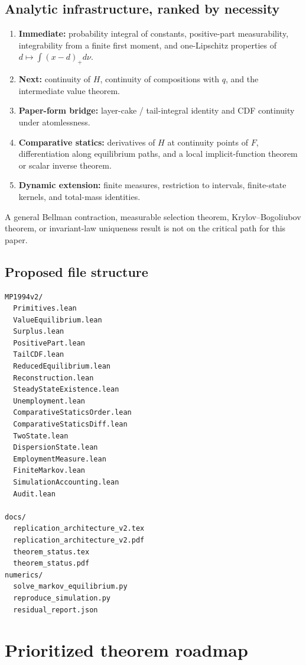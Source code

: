 \documentclass[11pt]{article}
\begin{document}
\subsection{Analytic infrastructure, ranked by necessity}

\begin{enumerate}
\item \textbf{Immediate:} probability integral of constants, positive-part measurability, integrability from a finite first moment, and one-Lipschitz properties of $d\mapsto\int(x-d)_+d\nu$.
\item \textbf{Next:} continuity of $H$, continuity of compositions with $q$, and the intermediate value theorem.
\item \textbf{Paper-form bridge:} layer-cake / tail-integral identity and CDF continuity under atomlessness.
\item \textbf{Comparative statics:} derivatives of $H$ at continuity points of $F$, differentiation along equilibrium paths, and a local implicit-function theorem or scalar inverse theorem.
\item \textbf{Dynamic extension:} finite measures, restriction to intervals, finite-state kernels, and total-mass identities.
\end{enumerate}

A general Bellman contraction, measurable selection theorem, Krylov--Bogoliubov theorem, or invariant-law uniqueness result is not on the critical path for this paper.

\subsection{Proposed file structure}

\begin{verbatim}
MP1994v2/
  Primitives.lean
  ValueEquilibrium.lean
  Surplus.lean
  PositivePart.lean
  TailCDF.lean
  ReducedEquilibrium.lean
  Reconstruction.lean
  SteadyStateExistence.lean
  Unemployment.lean
  ComparativeStaticsOrder.lean
  ComparativeStaticsDiff.lean
  TwoState.lean
  DispersionState.lean
  EmploymentMeasure.lean
  FiniteMarkov.lean
  SimulationAccounting.lean
  Audit.lean

docs/
  replication_architecture_v2.tex
  replication_architecture_v2.pdf
  theorem_status.tex
  theorem_status.pdf
numerics/
  solve_markov_equilibrium.py
  reproduce_simulation.py
  residual_report.json
\end{verbatim}

\newpage
\section{Prioritized theorem roadmap}
\end{document}
